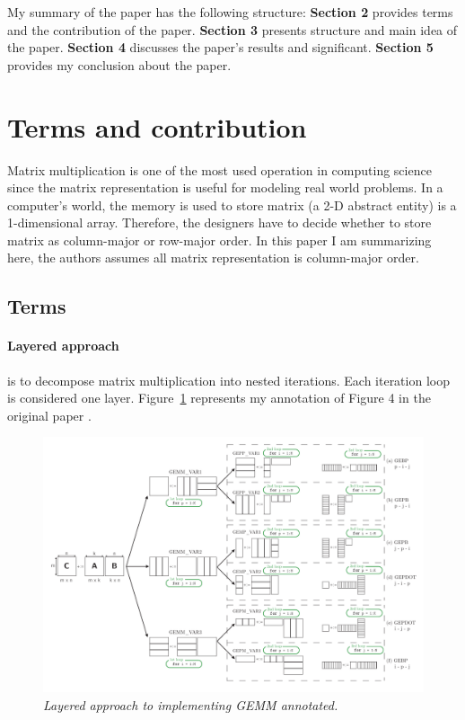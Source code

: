 \documentclass[a4paper,12pt]{article}
\begin{document}
My summary of the paper \cite{goto2008} has the following structure: \textbf{Section 2} provides terms and the contribution of the paper. \textbf{Section 3} presents structure and main idea of the paper. \textbf{Section 4} discusses the paper's results and significant. \textbf{Section 5} provides my conclusion about the paper.

\section{Terms and contribution}

\noindent
Matrix multiplication is one of the most used operation in computing science since the matrix representation is useful for modeling real world problems. In a computer's world, the memory is used to store matrix (a 2-D abstract entity) is a 1-dimensional array. Therefore, the designers have to decide whether to store matrix as column-major or row-major order. In this paper I am summarizing here, the authors assumes all matrix representation is column-major order.

\subsection{Terms}
\paragraph{Layered approach} is to decompose matrix multiplication into nested iterations. Each iteration loop is considered one layer. Figure~\ref{fig:layered} represents my annotation of Figure 4 in the original paper \cite{goto2008}.

\begin{figure}[h]
    \includegraphics[width=\textwidth]{fmcs_a3_layered}
    \caption{\emph{Layered approach to implementing GEMM annotated.} \cite{goto2008}}
    \label{fig:layered}
\end{figure}
\end{document}
